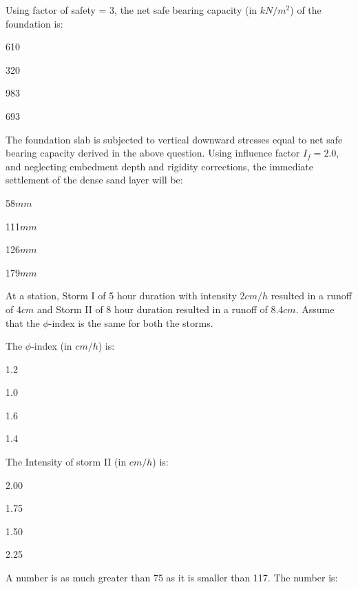 Using factor of safety = 3, the net safe bearing capacity (in $kN/m^2$) of the foundation is:
\begin{enumerate}
\begin{multicols}{4}
\item 610
\item 320
\item 983
\item 693
\end{multicols}
\end{enumerate}
\item The foundation slab is subjected to vertical downward stresses equal to net safe bearing capacity derived in the above question. Using influence factor $I_f=2.0$, and neglecting embedment depth and rigidity corrections, the immediate settlement of the dense sand layer will be:
\begin{enumerate}
\begin{multicols}{4}
\item 58$mm$
\item 111$mm$
\item 126$mm$
\item 179$mm$
\end{multicols}
\end{enumerate}
At a station, Storm I of 5 hour duration with intensity 2$cm/h$ resulted in a runoff of 4$cm$ and Storm II of 8 hour duration resulted in a runoff of 8.4$cm$. Assume that the $\phi$-index is the same for both the storms.
\item The $\phi$-index (in $cm/h$) is:
\begin{enumerate}
\begin{multicols}{4}
\item 1.2
\item 1.0
\item 1.6
\item 1.4
\end{multicols}
\end{enumerate}
\item  The Intensity of storm II (in $cm/h$) is:
\begin{enumerate}
\begin{multicols}{4}
\item 2.00
\item 1.75
\item 1.50
\item 2.25
\end{multicols}
\end{enumerate}
\item A number is as much greater than 75 as it is smaller than 117. The number is:
